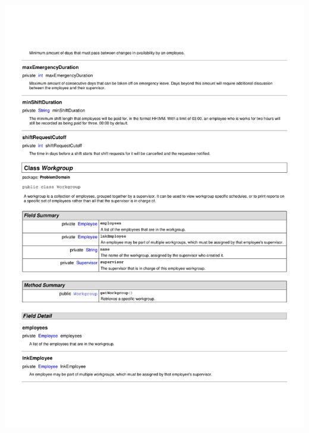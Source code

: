 \documentclass[letterpaper,12pt]{report}
\begin{document}
\includegraphics[scale=0.9,trim=20mm 30mm 25mm 25mm]{externals/ProblemDomainDataDictionary15.pdf}
\newpage
\end{document}
